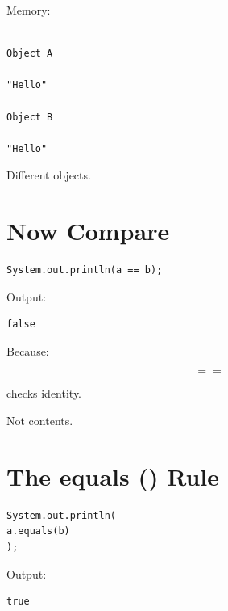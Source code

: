 \documentclass[11pt,a4paper]{book}
\begin{document}

Memory:

\begin{verbatim}

Object A

"Hello"

Object B

"Hello"

\end{verbatim}


Different objects.


\section{Now Compare}

\begin{verbatim}
System.out.println(a == b);
\end{verbatim}


Output:

\begin{verbatim}
false
\end{verbatim}


Because:

\[
==
\]

checks identity.


Not contents.


\section{The equals () Rule}

\begin{verbatim}
System.out.println(
a.equals(b)
);
\end{verbatim}


Output:

\begin{verbatim}
true
\end{verbatim}
\end{document}
